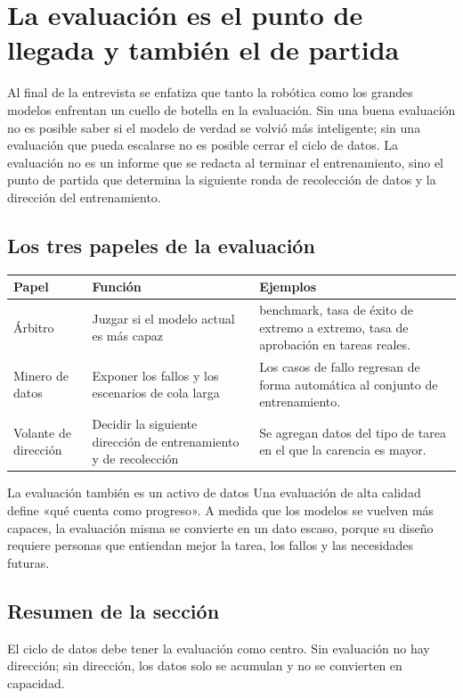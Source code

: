 \section{La evaluación es el punto de llegada y también el de partida}

Al final de la entrevista se enfatiza que tanto la robótica como los grandes modelos enfrentan un cuello de botella en la evaluación. Sin una buena evaluación no es posible saber si el modelo de verdad se volvió más inteligente; sin una evaluación que pueda escalarse no es posible cerrar el ciclo de datos. La evaluación no es un informe que se redacta al terminar el entrenamiento, sino el punto de partida que determina la siguiente ronda de recolección de datos y la dirección del entrenamiento.

\subsection{Los tres papeles de la evaluación}

\noindent\begin{longtable}{p{}p{}p{}}
\toprule
Papel & Función & Ejemplos \\
\midrule
Árbitro & Juzgar si el modelo actual es más capaz & benchmark, tasa de éxito de extremo a extremo, tasa de aprobación en tareas reales. \\
Minero de datos & Exponer los fallos y los escenarios de cola larga & Los casos de fallo regresan de forma automática al conjunto de entrenamiento. \\
Volante de dirección & Decidir la siguiente dirección de entrenamiento y de recolección & Se agregan datos del tipo de tarea en el que la carencia es mayor. \\
\bottomrule
\end{longtable}

\begin{importantbox}{La evaluación también es un activo de datos}
Una evaluación de alta calidad define «qué cuenta como progreso». A medida que los modelos se vuelven más capaces, la evaluación misma se convierte en un dato escaso, porque su diseño requiere personas que entiendan mejor la tarea, los fallos y las necesidades futuras.
\end{importantbox}

\subsection{Resumen de la sección}

El ciclo de datos debe tener la evaluación como centro. Sin evaluación no hay dirección; sin dirección, los datos solo se acumulan y no se convierten en capacidad.
